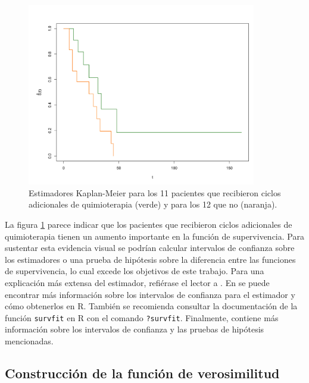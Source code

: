 \documentclass[11pt,a4paper]{article}
\begin{document}
\begin{figure}[h]
\centering\includegraphics[width=10cm]{km2.png}
\caption{Estimadores Kaplan-Meier para los 11 pacientes que recibieron ciclos adicionales de quimioterapia (verde) y para los 12 que no (naranja).}
\label{fig:km2}
\end{figure}

La figura \ref{fig:km2} parece indicar que los pacientes que recibieron ciclos adicionales de quimioterapia tienen un aumento importante en la función de supervivencia. Para sustentar esta evidencia visual se podrían calcular intervalos de confianza sobre los estimadores o una prueba de hipótesis sobre la diferencia entre las funciones de supervivencia, lo cual excede los objetivos de este trabajo. Para una explicación más extensa del estimador, refiérase el lector a \citet{kaplan-meier}. En \citet{moore} se puede encontrar más información sobre los intervalos de confianza para el estimador y cómo obtenerlos en R. También se recomienda consultar la documentación de la función \texttt{survfit} en R con el comando \texttt{?survfit}. Finalmente, \citet{klein} contiene más información sobre los intervalos de confianza y las pruebas de hipótesis mencionadas.\\

\subsection{Construcción de la función de verosimilitud}
\label{sec:ver}
\end{document}
